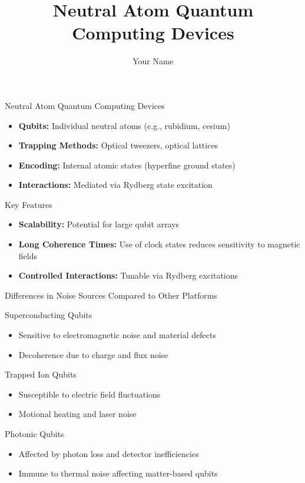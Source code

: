 \documentclass{beamer}
\title{Neutral Atom Quantum Computing Devices}
\author{Your Name}
\date{}
\begin{document}
\begin{frame}
\titlepage
\end{frame}

\begin{frame}{Neutral Atom Quantum Computing Devices}
    \begin{itemize}
        \item \textbf{Qubits:} Individual neutral atoms (e.g., rubidium, cesium)
        \item \textbf{Trapping Methods:} Optical tweezers, optical lattices
        \item \textbf{Encoding:} Internal atomic states (hyperfine ground states)
        \item \textbf{Interactions:} Mediated via Rydberg state excitation
    \end{itemize}
\end{frame}

\begin{frame}{Key Features}
    \begin{itemize}
        \item \textbf{Scalability:} Potential for large qubit arrays
        \item \textbf{Long Coherence Times:} Use of clock states reduces sensitivity to magnetic fields
        \item \textbf{Controlled Interactions:} Tunable via Rydberg excitations
    \end{itemize}
\end{frame}

\begin{frame}{Differences in Noise Sources Compared to Other Platforms}
    \begin{block}{Superconducting Qubits}
        \begin{itemize}
            \item Sensitive to electromagnetic noise and material defects
            \item Decoherence due to charge and flux noise
        \end{itemize}
    \end{block}
    \begin{block}{Trapped Ion Qubits}
        \begin{itemize}
            \item Susceptible to electric field fluctuations
            \item Motional heating and laser noise
        \end{itemize}
    \end{block}
    \begin{block}{Photonic Qubits}
        \begin{itemize}
            \item Affected by photon loss and detector inefficiencies
            \item Immune to thermal noise affecting matter-based qubits
        \end{itemize}
    \end{block}
\end{frame}
\end{document}
